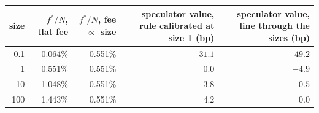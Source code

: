 \begin{tabular}{|r|r|r|r|r|}
\hline
\rowcolor{gray!15}size & $f^*/N$, flat fee & $f^*/N$, fee $\propto$ size & speculator value, rule calibrated at size 1 (bp) & speculator value, line through the sizes (bp) \\
\hline
0.1 & 0.064\% & 0.551\% & $-31.1$ & $-49.2$ \\
\hline
1 & 0.551\% & 0.551\% & 0.0 & $-4.9$ \\
\hline
10 & 1.048\% & 0.551\% & 3.8 & $-0.5$ \\
\hline
100 & 1.443\% & 0.551\% & 4.2 & 0.0 \\
\hline
\end{tabular}
